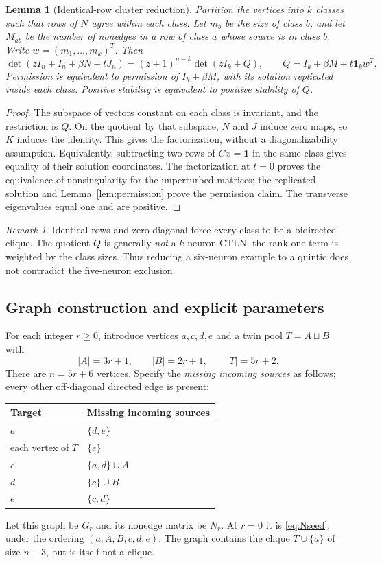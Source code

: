 \documentclass[11pt,a4paper]{article}
\newtheorem{lemma}[theorem]{Lemma}
\theoremstyle{definition}\newtheorem{definition}[theorem]{Definition}
\theoremstyle{remark}\newtheorem{remark}[theorem]{Remark}
\newcommand{\ones}{\mathbf{1}}
\begin{document}
\begin{lemma}[Identical-row cluster reduction]\label{lem:twin}
Partition the vertices into $k$ classes such that rows of $N$ agree within each class. Let $m_b$ be the size of class $b$, and let $M_{ab}$ be the number of nonedges in a row of class $a$ whose source is in class $b$. Write $w=(m_1,\ldots,m_k)^T$. Then
\begin{equation}\label{eq:quotientfactor}
 \det(zI_n+I_n+\beta N+tJ_n)
 =(z+1)^{n-k}\det(zI_k+Q),
 \qquad Q=I_k+\beta M+t\ones_k w^T.
\end{equation}
Permission is equivalent to permission of $I_k+\beta M$, with its solution replicated inside each class. Positive stability is equivalent to positive stability of $Q$.
\end{lemma}
\begin{proof}
The subspace of vectors constant on each class is invariant, and the restriction is $Q$. On the quotient by that subspace, $N$ and $J$ induce zero maps, so $K$ induces the identity. This gives the factorization, without a diagonalizability assumption. Equivalently, subtracting two rows of $Cx=\ones$ in the same class gives equality of their solution coordinates. The factorization at $t=0$ proves the equivalence of nonsingularity for the unperturbed matrices; the replicated solution and Lemma~\ref{lem:permission} prove the permission claim. The transverse eigenvalues equal one and are positive.
\end{proof}
\begin{remark}
Identical rows and zero diagonal force every class to be a bidirected clique. The quotient $Q$ is generally \emph{not} a $k$-neuron CTLN: the rank-one term is weighted by the class sizes. Thus reducing a six-neuron example to a quintic does not contradict the five-neuron exclusion.
\end{remark}

\subsection{Graph construction and explicit parameters}
For each integer $r\geq0$, introduce vertices $a,c,d,e$ and a twin pool
$T=A\sqcup B$ with
\[
 |A|=3r+1,\qquad |B|=2r+1,\qquad |T|=5r+2.
\]
There are $n=5r+6$ vertices. Specify the \emph{missing incoming sources} as follows; every other off-diagonal directed edge is present:
\begin{center}
\begin{tabular}{ll}\toprule
Target & Missing incoming sources\\\midrule
$a$ & $\{d,e\}$\\
each vertex of $T$ & $\{e\}$\\
$c$ & $\{a,d\}\cup A$\\
$d$ & $\{c\}\cup B$\\
$e$ & $\{c,d\}$\\\bottomrule
\end{tabular}
\end{center}
Let this graph be $G_r$ and its nonedge matrix be $N_r$. At $r=0$ it is \eqref{eq:Nseed}, under the ordering $(a,A,B,c,d,e)$. The graph contains the clique $T\cup\{a\}$ of size $n-3$, but is itself not a clique.
\end{document}
